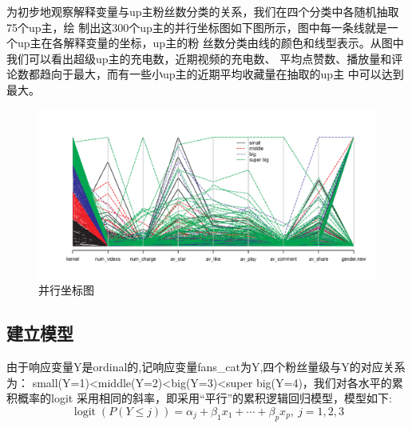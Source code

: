 \documentclass{ctexart}
\begin{document}
为初步地观察解释变量与up主粉丝数分类的关系，我们在四个分类中各随机抽取75个up主，绘
制出这300个up主的并行坐标图如下图所示，图中每一条线就是一个up主在各解释变量的坐标，up主的粉
丝数分类由线的颜色和线型表示。从图中我们可以看出超级up主的充电数，近期视频的充电数、
平均点赞数、播放量和评论数都趋向于最大，而有一些小up主的近期平均收藏量在抽取的up主
中可以达到最大。

\begin{figure}[H]
    \centering
    \includegraphics[width=1.0\textwidth]{MLR/Figure_parcoord.png}
    \caption{并行坐标图}
\end{figure}

\subsection{建立模型}

由于响应变量Y是ordinal的,记响应变量fans\_cat为Y,四个粉丝量级与Y的对应关系为：
small(Y=1)<middle(Y=2)<big(Y=3)<super big(Y=4)，我们对各水平的累积概率的logit
采用相同的斜率，即采用“平行”的累积逻辑回归模型，模型如下:
\begin{equation}
    \operatorname{logit}(P(Y\le j))=\alpha_j+\beta_1x_1+\cdots+\beta_px_p,\ j=1,2,3
\end{equation}
\end{document}
